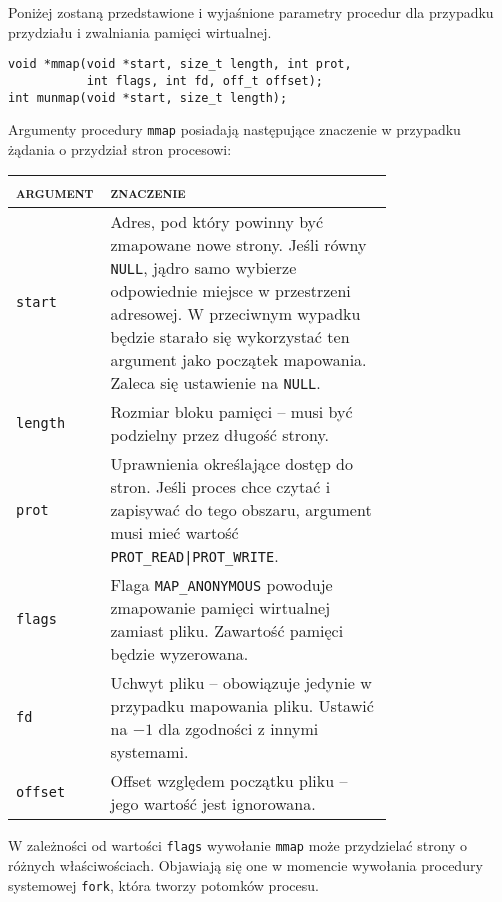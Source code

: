 \documentclass[12pt,a4paper,titlepage,twoside]{mwart}
\begin{document}
Poniżej zostaną przedstawione i wyjaśnione parametry procedur dla przypadku
przydziału i zwalniania pamięci wirtualnej.

\vspace{4ex}
\begin{lstlisting}[caption={Prototypy procedur \texttt{mmap} i \texttt{munmap}.}]
void *mmap(void *start, size_t length, int prot,
           int flags, int fd, off_t offset);
int munmap(void *start, size_t length);
\end{lstlisting}

Argumenty procedury \texttt{mmap} posiadają następujące znaczenie w przypadku
żądania o przydział stron procesowi:
\begin{center}
\begin{tabular}{|l|p{0.75\linewidth}|}
\hline
\textsc{argument} & \textsc{znaczenie} \\
\hline
\hline
\verb+start+  & Adres, pod który powinny być zmapowane nowe strony. Jeśli równy
\texttt{NULL}, jądro samo wybierze odpowiednie miejsce w przestrzeni adresowej.
W przeciwnym wypadku będzie starało się wykorzystać ten argument jako początek
mapowania. Zaleca się ustawienie na \texttt{NULL}.\\
\hline
\verb+length+ & Rozmiar bloku pamięci -- musi być podzielny przez długość strony. \\
\hline
\verb+prot+   & Uprawnienia określające dostęp do stron. Jeśli proces chce
czytać i zapisywać do tego obszaru, argument musi mieć wartość
\verb+PROT_READ|PROT_WRITE+. \\
\hline
\verb+flags+  & Flaga \verb+MAP_ANONYMOUS+ powoduje zmapowanie pamięci
wirtualnej zamiast pliku. Zawartość pamięci będzie wyzerowana. \\
\hline
\verb+fd+     & Uchwyt pliku -- obowiązuje jedynie w przypadku mapowania pliku.
Ustawić na $-1$ dla zgodności z innymi systemami. \\
\hline
\verb+offset+ & Offset względem początku pliku -- jego wartość jest ignorowana. \\
\hline
\end{tabular}
\end{center}

W zależności od wartości \texttt{flags} wywołanie \texttt{mmap} może
przydzielać strony o różnych właściwościach. Objawiają się one w momencie
wywołania procedury systemowej \texttt{fork}, która tworzy potomków procesu.
\end{document}
